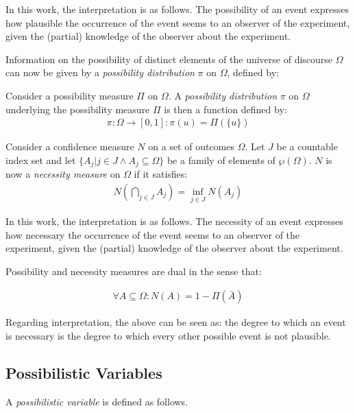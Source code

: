 In this work, the interpretation is as follows. The possibility of an event expresses how plausible the occurrence of the event seems to an observer of the experiment, given the (partial) knowledge of the observer about the experiment.

Information on the possibility of distinct elements of the universe of discourse $\Omega$ can now be given by a \emph{possibility distribution} $\pi$ on $\Omega$, defined by:

\begin{definition}
Consider a possibility measure $\Pi$ on $\Omega$. A \emph{possibility distribution} $\pi$ on $\Omega$ underlying the possibility measure $\Pi$ is then a function defined by:
	\begin{align}
	\pi : \Omega \rightarrow \left[0, 1\right] : \pi(u) = \Pi(\{u\})
	\end{align}
\end{definition}

\begin{definition}
Consider a confidence measure $N$ on a set of outcomes $\Omega$. Let $J$ be a countable index set and let $\{ A_{j} | j \in J \wedge A_{j} \subseteq \Omega \}$ be a family of elements of $\wp(\Omega)$. $N$ is now a \emph{necessity measure} on $\Omega$ if it satisfies:
	\begin{align}
	N\left(\bigcap_{j \in J} A_{j} \right) = \inf_{j \in J} N(A_{j})
	\end{align}
\end{definition}

In this work, the interpretation is as follows. The necessity of an event expresses how necessary the occurrence of the event seems to an observer of the experiment, given the (partial) knowledge of the observer about the experiment.

Possibility and necessity measures are dual in the sense that:

\begin{align}
\forall A \subseteq \Omega : N(A) = 1 - \Pi(\bar{A})
\end{align}

Regarding interpretation, the above can be seen as: the degree to which an event is necessary is the degree to which every other possible event is not plausible.

\subsection{\label{subsec:possibilistic-variables}Possibilistic Variables}
A \emph{possibilistic variable} is defined as follows\cite{Pon11}.

